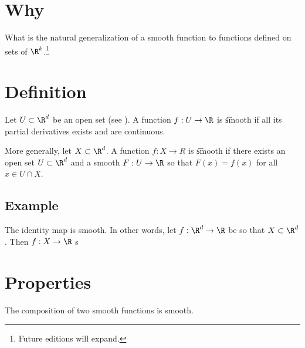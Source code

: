 

\section*{Why}

What is the natural generalization of a smooth function to functions defined on sets of $\R ^k$.\footnote{Future editions will expand.}

\section*{Definition}

Let $U \subset \R ^d$ be an open set (see ).
A function $f: U \to \R $ is \t{smooth} if all its partial derivatives exists and are continuous.

More generally, let $X \subset \R ^d$.
A function $f: X \to R$ is \t{smooth} if there exists an open set $U \subset \R ^d$ and a smooth $F: U \to \R $ so that $F(x) = f(x)$ for all $x \in U \cap  X$.

\subsection*{Example}

The identity map is smooth.
In other words, let $f: \R ^d \to \R $ be so that $X \subset \R ^d$.
Then $f: X \to \R $ s

\section*{Properties}

\begin{proposition}
The composition of two smooth functions is smooth.
\end{proposition}

\blankpage